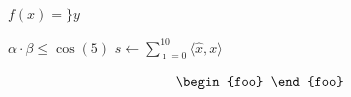 \documentclass[12pt]{article}
\newcommand\"{quote}
\begin{document}

\wrapcommand{$}


\wrapcommand{\[}


$f(x) = \} {} y$

$\alpha \cdot \beta \leq \cos( 5 )$
%
$s \gets \sum_{\imath = 0}^10 \langle \hat{x}, x \rangle$

$$
  \begin{foo}
  \end{foo}
$$
\end{document}
